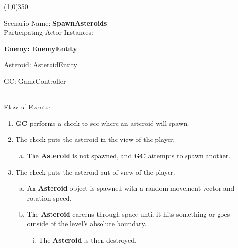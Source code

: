\documentclass[12pt]{article}       %
\begin{document}
\begin{center} \line(1,0){350} \end{center}
Scenario Name: {\bf SpawnAsteroids} \\
Participating Actor Instances:        \hspace{46pt} {\bf Enemy: EnemyEntity

						\hspace{2.6 in} Asteroid: AsteroidEntity

						\hspace{2.6 in}  GC: GameController}  \vspace{10pt}  \\ 
Flow of Events: 
\begin{enumerate} 
\item {\bf GC} performs a check to see where an asteroid will spawn.
\item The check puts the asteroid in the view of the player.
	\begin{enumerate} [a.]
	\item The {\bf Asteroid} is not spawned, and {\bf GC} attempts to spawn another.
	\end{enumerate}
\item The check puts the asteroid out of view of the player.
	\begin{enumerate} [a.]
	\item An {\bf Asteroid} object is spawned with a random movement vector and rotation speed.
	\item The {\bf Asteroid} careens through space until it hits something or goes outside of the level's absolute boundary.
		\begin{enumerate} [i.]
		\item The {\bf Asteroid} is then destroyed.
		\end{enumerate}
	\end{enumerate}
\end{enumerate}
\end{document}
